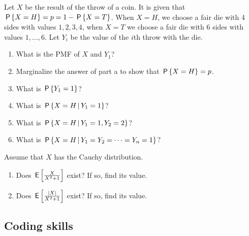 \documentclass[assignments]{subfiles}
\begin{document}
\begin{exercise}
Let $X$ be the result of the throw of a coin.
It is given that $\P{X=H} = p = 1-\P{X=T}$.
When $X=H$, we choose a fair die with 4 sides with values $1,2,3,4$, when $X=T$ we choose a fair die with 6 sides with values $1,\ldots,6$.
Let $Y_i$ be the value of the $i$th throw with the die.
\begin{enumerate}
\item What is the PMF of $X$ and $Y_1$?
\item Marginalize  the answer of part a to show that $\P{X=H} = p$. 
\item What is $\P{Y_{1}=1}$?
\item What is $\P{X=H \given Y_1=1}$?
\item What is $\P{X=H \given Y_1=1, Y_2=2}$?
\item What is $\P{X=H \given Y_1=Y_2=\cdots=Y_n = 1}$?
\end{enumerate}
\end{exercise}



\begin{exercise} %
Assume that $X$ has the Cauchy distribution. 
\begin{enumerate}
\item Does $\E{\frac{X}{X^2+1}}$ exist? If so, find its value. 
\item Does $\E{\frac{|X|}{X^2+1}}$ exist? If so, find its value. 
\end{enumerate}
\end{exercise}


\subsection{Coding skills}
\label{sec:coding-skills}
\end{document}
